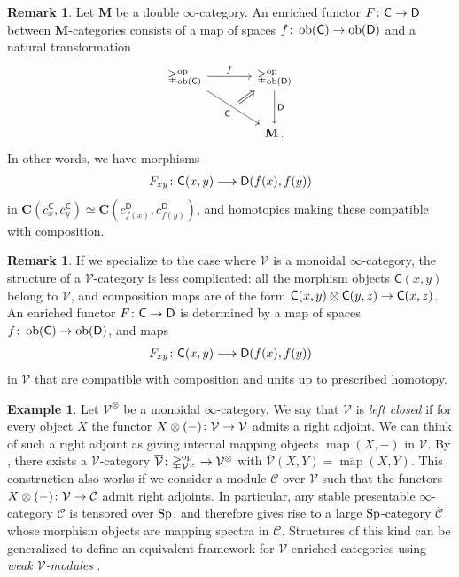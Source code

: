 \documentclass[10pt]{amsart}
\numberwithin{equation}{section}
\theoremstyle{definition}
\newtheorem{ex}[prop]{Example}
\newtheorem{rem}[prop]{Remark}
\DeclareMathOperator{\map}{map}
\DeclareMathOperator{\ob}{ob}
\DeclareMathOperator{\op}{op}
\newcommand{\Simp}{\mathbb{\Delta}}
\newcommand{\cC}{\mathcal{C}}
\newcommand{\cV}{\mathcal{V}}
\newcommand{\bfC}{\mathbf{C}}
\newcommand{\bfM}{\mathbf{M}}
\newcommand{\sfC}{\mathsf{C}}
\newcommand{\sfD}{\mathsf{D}}
\newcommand{\Sp}{\mathrm{Sp}\vphantom{p}}
\renewcommand{\to}{\mathchoice{\longrightarrow}{\rightarrow}{}{}}
\begin{document}
	\begin{rem}\label{rem:unwiding_enriched_functor}
		Let $\bfM$ be a double $\infty$-category.
    An enriched functor $F\colon \sfC\to \sfD$ between $\bfM$-categories consists of a map of spaces $f\colon \ob(\sfC) \to \ob(\sfD)$ and a natural transformation
		\begin{equation*}
			\begin{tikzcd}[row sep=large, column sep=large]
				\Simp^{\op}_{\ob(\sfC)} \arrow[r,"f"] \arrow[dr, "\sfC"' ,""{name=T}]      &   \Simp^{\op}_{\ob(\sfD)}  \arrow[d, "\sfD"] \\
		        &   \bfM \, .
				\arrow[from=T, to=1-2, Rightarrow]
			\end{tikzcd}
		\end{equation*}
		In other words, we have morphisms
		\begin{align*}
			F_{xy}\colon \sfC(x,y) \to \sfD( f(x), f(y))
		\end{align*}
		in $\bfC(c_{x}^{\sfC}, c_{y}^{\sfC}) \simeq \bfC (c_{f(x)}^{\sfD}, c_{f(y)}^{\sfD} )$, and homotopies making these compatible with composition.
	\end{rem}

	\begin{rem}\label{rem:enriched_in_monoidal}
		If we specialize to the case where $\cV$ is a monoidal $\infty$-category, the structure of a $\cV$-category is less complicated: all the morphism objects $\sfC(x,y)$ belong to $\cV$, and composition maps are of the form $\sfC(x,y)\otimes \sfC(y,z) \to \sfC(x,z)$.
    An enriched functor $F\colon \sfC\to \sfD$ is determined by a map of spaces $f\colon \ob(\sfC) \to \ob(\sfD)$, and maps
		\begin{align*}
			F_{xy}\colon \sfC(x,y) \to \sfD(f(x),f(y))
		\end{align*}
		 in $\cV$ that are compatible with composition and units up to prescribed homotopy.
	\end{rem}
	\begin{ex}\label{ex:enriched_from_closed}
		Let $\cV^{\otimes}$ be a monoidal $\infty$-category. We say that $\cV$ is \emph{left closed} if for every object $X$ the functor $X \otimes (-)\colon \cV\to\cV$ admits a right adjoint.
    We can think of such a right adjoint as giving internal mapping objects $\overline{\map}(X,-)$ in $\cV$.
    By \cite[Example 7.2.11, Corollary 7.4.10]{GH}, there exists a $\cV$-category $\overline{\cV}\colon\Simp^{\op}_{\cV^{\simeq}} \to \cV^{\otimes}$ with $\overline{\cV}(X,Y) = \overline{\map}(X,Y)$.
    This construction also works if we consider a module $\cC$ over $\cV$ such that the functors $X\otimes (-)\colon \cV \to \cC$ admit right adjoints.
    In particular, any stable presentable $\infty$-category $\cC$ is tensored over $\Sp$, and therefore gives rise to a large $\Sp$-category $\overline{\cC}$ whose morphism objects are mapping spectra in $\cC$.
    Structures of this kind can be generalized to define an equivalent framework for $\cV$-enriched categories using \emph{weak $\cV$-modules} \cite{hinich2018yoneda,heine2025equivalence}.
	\end{ex}
\end{document}
